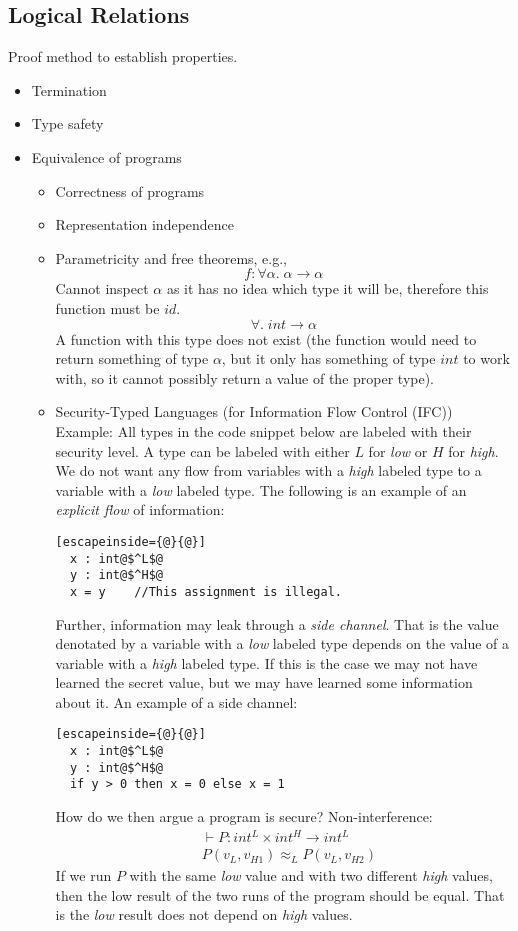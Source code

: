 \documentclass[a4paper,10pt,fleqn]{article}
\newcommand{\tarrow}[2]{\ensuremath{ #1 \rightarrow #2}}
\begin{document}
\subsection*{Logical Relations}
Proof method to establish properties.
\begin{itemize}
\item Termination
\item Type safety
\item Equivalence of programs
  \begin{itemize}
  \item Correctness of programs
  \item Representation independence
  \item Parametricity and free theorems, e.g.,
    \[
    f: \forall \alpha. \; \tarrow{\alpha}{\alpha}
    \]
    Cannot inspect $\alpha$ as it has no idea which type it will be, therefore this function must be $id$.
    \[
    \forall. \; \tarrow{int}{\alpha}
    \]
    A function with this type does not exist (the function would need to return something of type $\alpha$, but it only has something of type $int$ to work with, so it cannot possibly return a value of the proper type).
  \item Security-Typed Languages (for Information Flow Control (IFC))\\
        Example: All types in the code snippet below are labeled with their security level. A type can be labeled with either $L$ for \emph{low} or $H$ for \emph{high}. We do not want any flow from variables with a \emph{high} labeled type to a variable with a \emph{low} labeled type. The following is an example of an \emph{explicit flow} of information:
        \begin{lstlisting}[escapeinside={@}{@}]
  x : int@$^L$@
  y : int@$^H$@
  x = y    //This assignment is illegal.
        \end{lstlisting}
Further, information may leak through a \emph{side channel}. That is the value denotated by a variable with a \emph{low} labeled type depends on the value of a variable with a \emph{high} labeled type. If this is the case we may not have learned the secret value, but we may have learned some information about it. An example of a side channel:
        \begin{lstlisting}[escapeinside={@}{@}]
  x : int@$^L$@
  y : int@$^H$@
  if y > 0 then x = 0 else x = 1
        \end{lstlisting}
How do we then argue a program is secure? Non-interference:
\begin{align*}
  & \vdash P : \tarrow{int^L \times int^H}{int^L} \\
  & P(v_L,v_{H1}) \approx_L P(v_L,v_{H2})
\end{align*}
If we run $P$ with the same \emph{low} value and with two different \emph{high} values, then the low result of the two runs of the program should be equal. That is the \emph{low} result does not depend on \emph{high} values.
  \end{itemize}
\end{itemize}
\end{document}
